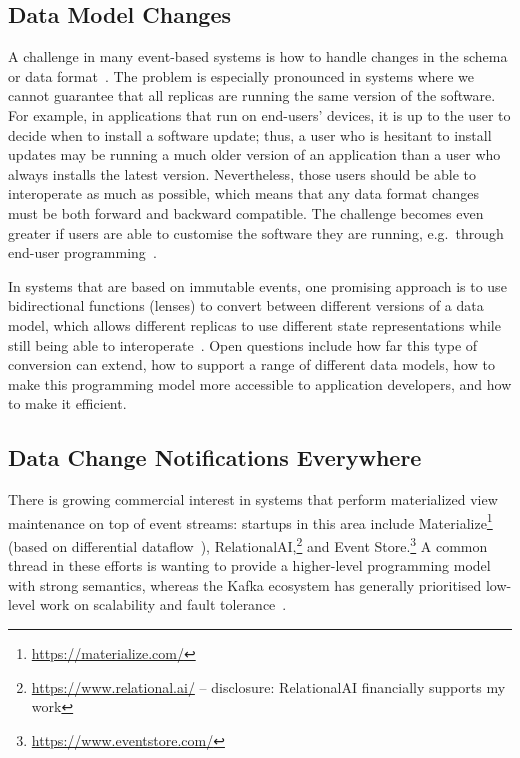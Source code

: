 \documentclass[sigconf]{acmart}
\begin{document}
\subsection{Data Model Changes}

A challenge in many event-based systems is how to handle changes in the schema or data format~\cite{Overeem:2017}.
The problem is especially pronounced in systems where we cannot guarantee that all replicas are running the same version of the software.
For example, in applications that run on end-users' devices, it is up to the user to decide when to install a software update; thus, a user who is hesitant to install updates may be running a much older version of an application than a user who always installs the latest version.
Nevertheless, those users should be able to interoperate as much as possible, which means that any data format changes must be both forward and backward compatible.
The challenge becomes even greater if users are able to customise the software they are running, e.g.\ through end-user programming~\cite{EndUserProgramming}.

In systems that are based on immutable events, one promising approach is to use bidirectional functions (lenses) to convert between different versions of a data model, which allows different replicas to use different state representations while still being able to interoperate~\cite{Litt:2021}.
Open questions include how far this type of conversion can extend, how to support a range of different data models, how to make this programming model more accessible to application developers, and how to make it efficient.

\subsection{Data Change Notifications Everywhere}

There is growing commercial interest in systems that perform materialized view maintenance on top of event streams: startups in this area include Materialize\footnote{\url{https://materialize.com/}} (based on differential dataflow~\cite{McSherry:2013}), RelationalAI,\footnote{\url{https://www.relational.ai/} -- disclosure: RelationalAI financially supports my work} and Event Store.\footnote{\url{https://www.eventstore.com/}}
A common thread in these efforts is wanting to provide a higher-level programming model with strong semantics, whereas the Kafka ecosystem has generally prioritised low-level work on scalability and fault tolerance~\cite{Brandon:2021}.
\end{document}

